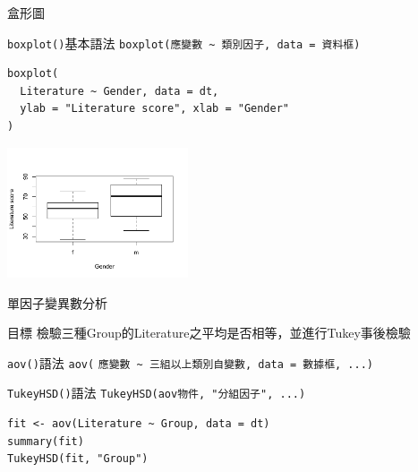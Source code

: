 \documentclass[12pt]{beamer}
\begin{document}
\begin{frame}[fragile]{盒形圖}

\begin{block}{\texttt{boxplot()}基本語法}
\verb+boxplot(應變數 ~ 類別因子, data = 資料框)+
\end{block}

\begin{verbatim}
boxplot(
  Literature ~ Gender, data = dt, 
  ylab = "Literature score", xlab = "Gender"
)
\end{verbatim}

\begin{center}
\includegraphics[width=0.4\textwidth]{Rplot-two-group.pdf}
\end{center}
\end{frame}

\begin{frame}[fragile]{單因子變異數分析}
\begin{block}{目標}
檢驗三種Group的Literature之平均是否相等，並進行Tukey事後檢驗
\end{block}

\begin{block}{\texttt{aov()}語法}
\verb+aov(+
\verb+應變數 ~ 三組以上類別自變數, data = 數據框, ...)+
\end{block}

\begin{block}{\texttt{TukeyHSD()}語法}
\verb+TukeyHSD(aov物件, "分組因子", ...)+
\end{block}

\begin{verbatim}
fit <- aov(Literature ~ Group, data = dt)
summary(fit)
TukeyHSD(fit, "Group")
\end{verbatim}

\end{frame}
\end{document}
